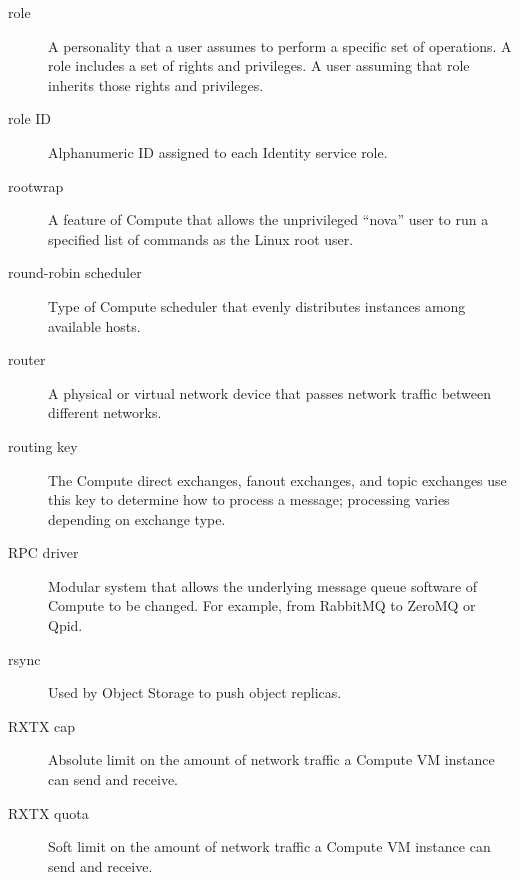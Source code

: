 \documentclass[letterpaper,10pt,english]{sphinxmanual}
\begin{document}
\begin{description}
\item[{role}] \leavevmode{}\label{_source/glossary:term-role}
A personality that a user assumes to perform a specific set of
operations. A role includes a set of rights and privileges. A user
assuming that role inherits those rights and privileges.

\item[{role ID}] \leavevmode{}\label{_source/glossary:term-role-id}
Alphanumeric ID assigned to each Identity service role.

\item[{rootwrap}] \leavevmode{}\label{_source/glossary:term-rootwrap}
A feature of Compute that allows the unprivileged ``nova'' user to
run a specified list of commands as the Linux root user.

\item[{round-robin scheduler}] \leavevmode{}\label{_source/glossary:term-round-robin-scheduler}
Type of Compute scheduler that evenly distributes instances
among available hosts.

\item[{router}] \leavevmode{}\label{_source/glossary:term-router}
A physical or virtual network device that passes network
traffic between different networks.

\item[{routing key}] \leavevmode{}\label{_source/glossary:term-routing-key}
The Compute direct exchanges, fanout exchanges, and topic
exchanges use this key to determine how to process a message;
processing varies depending on exchange type.

\item[{RPC driver}] \leavevmode{}\label{_source/glossary:term-rpc-driver}
Modular system that allows the underlying message queue software
of Compute to be changed. For example, from RabbitMQ to ZeroMQ or
Qpid.

\item[{rsync}] \leavevmode{}\label{_source/glossary:term-rsync}
Used by Object Storage to push object replicas.

\item[{RXTX cap}] \leavevmode{}\label{_source/glossary:term-rxtx-cap}
Absolute limit on the amount of network traffic a Compute VM
instance can send and receive.

\item[{RXTX quota}] \leavevmode{}\label{_source/glossary:term-rxtx-quota}
Soft limit on the amount of network traffic a Compute VM
instance can send and receive.

\end{description}
\end{document}
